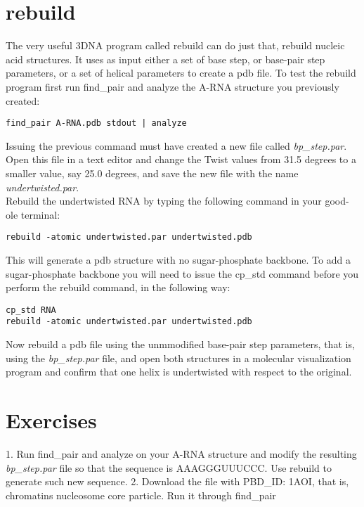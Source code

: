 \section{rebuild}
The very useful 3DNA  program called  \textrm{rebuild} can  do just
that, rebuild nucleic acid structures. It uses as input either a set of base
step, or base-pair step parameters, or a set of helical parameters to
create a pdb file.
To  test  the  rebuild   program  first  run  \textrm{find\_pair}  and
\textrm{analyze} the A-RNA structure you previously created:
\begin{Verbatim}
find_pair A-RNA.pdb stdout | analyze
\end{Verbatim}
Issuing  the previous command must  have created  a new  file called
\textit{bp\_step.par}.
Open this file in a text editor and change the Twist values from 31.5 degrees
to a smaller value, say 25.0 degrees, and save the new file with the name
\textit{undertwisted.par}.\\
Rebuild the undertwisted RNA by typing the following command in your good-ole
terminal:
\begin{Verbatim}
rebuild -atomic undertwisted.par undertwisted.pdb
\end{Verbatim}
This   will  generate   a  pdb   structure  with   no  sugar-phosphate
backbone. To add a sugar-phosphate backbone you will need to issue the
\textrm{cp\_std}  command  before   you  perform  the  \textrm{rebuild}
command, in the following way:
\begin{Verbatim}
cp_std RNA
rebuild -atomic undertwisted.par undertwisted.pdb
\end{Verbatim}
Now  rebuild   a  pdb  file  using  the   unmmodified  base-pair  step
parameters,  that  is,  using  the  \textit{bp\_step.par} file,  and  open  both
structures in  a molecular visualization program and  confirm that one
helix is undertwisted with respect to the original.

\section{Exercises}
1. Run  \textrm{find\_pair} and analyze on your A-RNA structure  and modify the
resulting   \textit{bp\_step.par}  file  so   that  the   sequence  is
AAAGGGUUUCCC. Use rebuild to generate such new sequence.
2.  Download  the  file   with  PBD\_ID:  1AOI,  that  is,  chromatins
nucleosome core particle. Run it through \textrm{find\_pair}








